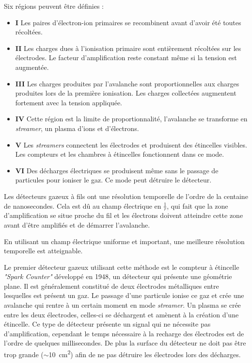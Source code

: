 Six régions peuvent être définies :

\begin{itemize}
	\item \textbf{I} Les paires d'électron-ion primaires se recombinent avant d'avoir été toutes récoltées.
	\item \textbf{II} Les charges dues à l'ionisation primaire sont entièrement récoltées sur les électrodes. Le facteur d'amplification reste constant même si la tension est augmentée.
	\item \textbf{III} Les charges produites par l'avalanche sont proportionnelles aux charges produites lors de la première ionisation. Les charges collectées augmentent fortement avec la tension appliquée.
	\item \textbf{IV} Cette région est la limite de proportionnalité, l'avalanche se transforme en \textit{streamer}, un plasma d'ions et d'électrons.
	\item \textbf{V} Les \textit{streamers} connectent les électrodes et produisent des étincelles visibles. Les compteurs  et les chambres à étincelles fonctionnent dans ce mode.
	\item \textbf{VI} Des décharges électriques se produisent même sans le passage de particules pour ioniser le gaz. Ce mode peut détruire le détecteur.
\end{itemize}

Les détecteurs gazeux à fils ont une résolution temporelle de l'ordre de la centaine de nanosecondes. Cela est dû au champ électrique en $\frac{1}{r}$, qui fait que la zone d'amplification se situe proche du fil et les électrons doivent atteindre cette zone avant d'être amplifiés et de démarrer l'avalanche.

En utilisant un champ électrique uniforme et important, une meilleure résolution temporelle est atteignable.

Le premier détecteur gazeux utilisant cette méthode est le compteur à étincelle \textit{"Spark Counter"} développé en \num{1948}, un détecteur qui présente une géométrie plane. Il est généralement constitué de deux électrodes métalliques entre lesquelles est présent un gaz. Le passage d'une particule ionise ce gaz et crée une avalanche qui rentre à un certain moment en mode \textit{streamer}. Un plasma se crée entre les deux électrodes, celles-ci se déchargent et amènent à la création d'une étincelle. Ce type de détecteur présente un signal qui ne nécessite pas d'amplification, cependant le temps nécessaire à la recharge des électrodes est de l'ordre de quelques millisecondes. De plus la surface du détecteur ne doit pas être trop grande ($\sim$\SI{10}{\square\centi\meter}) afin de ne pas détruire les électrodes lors des décharges.

